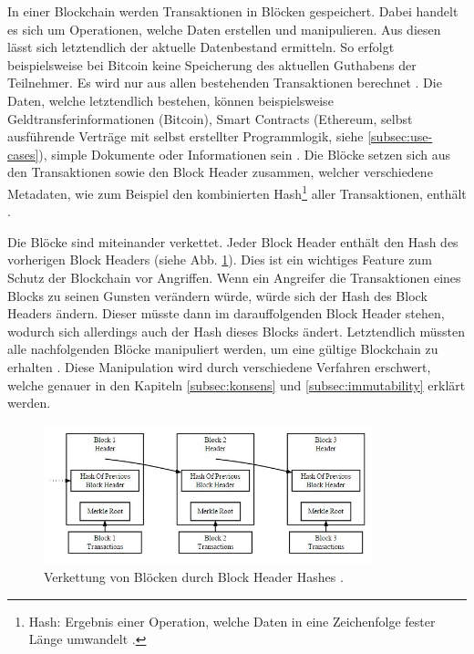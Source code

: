 In einer Blockchain werden Transaktionen in Blöcken gespeichert. Dabei handelt es sich um Operationen, welche Daten erstellen und manipulieren. Aus diesen lässt sich letztendlich der aktuelle Datenbestand ermitteln. So erfolgt beispielsweise bei Bitcoin keine Speicherung des aktuellen Guthabens der Teilnehmer. Es wird nur aus allen bestehenden Transaktionen berechnet \cite[S.~85]{AntonopoulosMasteringbitcoin2015}. Die Daten, welche letztendlich bestehen, können beispielsweise Geldtransferinformationen (Bitcoin), Smart Contracts (Ethereum, selbst ausführende Verträge mit selbst erstellter Programmlogik, siehe \ref{subsec:use-cases}), simple Dokumente oder Informationen sein \cite{EthereumTeamEthereumWhitePaper2017}\cite{NakamotoBitcoinPeertoPeerElectronic2008}\cite{HyperledgerFabricTeamHyperledgerWhitepaper2016}. Die Blöcke setzen sich aus den Transaktionen sowie den Block Header zusammen, welcher verschiedene Metadaten, wie zum Beispiel den kombinierten Hash\footnote{Hash: Ergebnis einer Operation, welche Daten in eine Zeichenfolge fester Länge umwandelt \cite[S.~\Rn{7}]{SwanBlockchainblueprintnew2015}.} aller Transaktionen, enthält \cite[S.~160-161]{AntonopoulosMasteringbitcoin2015}.

Die Blöcke sind miteinander verkettet. Jeder Block Header enthält den Hash  des vorherigen Block Headers (siehe Abb. \ref{fig:block-chain}). Dies ist ein wichtiges Feature zum Schutz der Blockchain vor Angriffen. Wenn ein Angreifer die Transaktionen eines Blocks zu seinen Gunsten verändern würde, würde sich der Hash des Block Headers ändern. Dieser müsste dann im darauffolgenden Block Header stehen, wodurch sich allerdings auch der Hash dieses Blocks ändert. Letztendlich müssten alle nachfolgenden Blöcke manipuliert werden, um eine gültige Blockchain zu erhalten \cite{NakamotoBitcoinPeertoPeerElectronic2008}. Diese Manipulation wird durch verschiedene Verfahren erschwert, welche genauer in den Kapiteln \ref{subsec:konsens} und \ref{subsec:immutability} erklärt werden.

\begin{figure}[!htbp]
  \centering
	\includegraphics[width=0.85\textwidth,angle=0]{images/block-chain}
 	\caption{Verkettung von Blöcken durch Block Header Hashes \cite{RosicWhatHashingHood2017}.}
	\label{fig:block-chain}
\end{figure}

